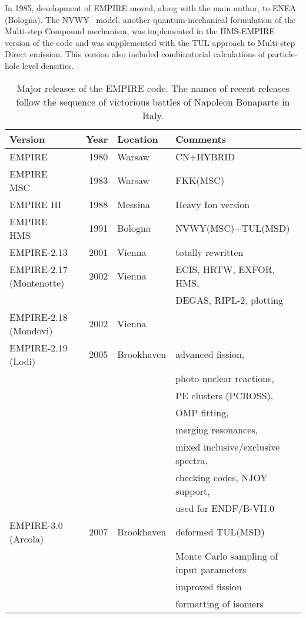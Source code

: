 In 1985, development of EMPIRE moved, along with the main author, to
ENEA (Bologna). The NVWY~\cite{NVWY} model, another quantum-mechanical
formulation of the Multi-step Compound mechanism, was implemented
in the HMS-EMPIRE version of the code and was
supplemented with the TUL approach\cite{TUL} to Multi-step Direct
emission. This version also included combinatorial calculations of
particle-hole level densities.

\begin{table*}[tbp]
\caption{Major releases of the EMPIRE code. The names of recent releases follow the sequence of victorious
battles of Napoleon Bonaparte in Italy.}
\label{tab:emp-history}%
\begin{tabular}{lrll}
\hline
\textbf{Version} & \textbf{\ Year } & \textbf{Location} & \textbf{Comments}
\\ \hline
EMPIRE & 1980 & Warsaw & CN+HYBRID \\
EMPIRE MSC & 1983 & Warsaw & FKK(MSC) \\
EMPIRE HI & 1988 & Messina & Heavy Ion version \\
EMPIRE HMS & 1991 & Bologna & NVWY(MSC)+TUL(MSD) \\
EMPIRE-2.13 & 2001 & Vienna & totally rewritten \\
EMPIRE-2.17 (Montenotte) & 2002 & Vienna & ECIS, HRTW, EXFOR, HMS, \\
&  &  & DEGAS, RIPL-2, plotting \\
EMPIRE-2.18 (Mondovi) & 2002 & Vienna &  \\
EMPIRE-2.19 (Lodi) & 2005 & Brookhaven & advanced fission, \\
&  &  & photo-nuclear reactions, \\
&  &  & PE clusters (PCROSS), \\
&  &  & OMP fitting, \\
&  &  & merging resonances, \\
&  &  & mixed inclusive/exclusive spectra, \\
&  &  & checking codes, NJOY support, \\
&  &  & used for ENDF/B-VII.0 \\
EMPIRE-3.0 (Arcola) & 2007 & Brookhaven & deformed TUL(MSD) \\
&  &  & Monte Carlo sampling of input parameters \\
&  &  & improved fission \\
&  &  & formatting of isomers \\ \hline
\end{tabular}%
\end{table*}

